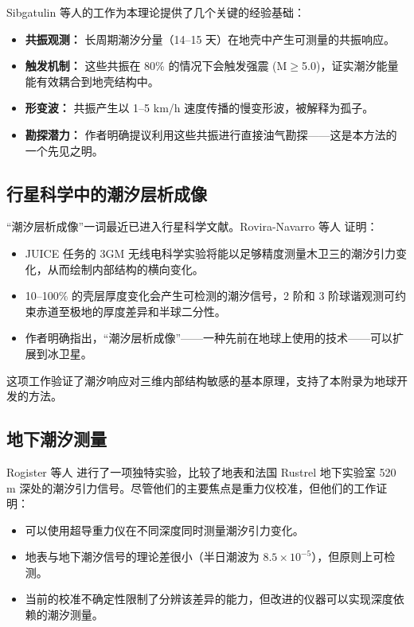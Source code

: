 \documentclass[12pt,a4paper]{article}
\theoremstyle{remark}
\begin{document}
	Sibgatulin 等人的工作为本理论提供了几个关键的经验基础：
	
	\begin{itemize}
		\item \textbf{共振观测：} 长周期潮汐分量（14–15 天）在地壳中产生可测量的共振响应。
		\item \textbf{触发机制：} 这些共振在 80\% 的情况下会触发强震 (M$\ge$5.0)，证实潮汐能量能有效耦合到地壳结构中。
		\item \textbf{形变波：} 共振产生以 1–5 km/h 速度传播的慢变形波，被解释为孤子。
		\item \textbf{勘探潜力：} 作者明确提议利用这些共振进行直接油气勘探——这是本方法的一个先见之明。
	\end{itemize}
	
	\subsection{行星科学中的潮汐层析成像}
	
	“潮汐层析成像”一词最近已进入行星科学文献。Rovira-Navarro 等人 \cite{RoviraNavarro2025} 证明：
	
	\begin{itemize}
		\item JUICE 任务的 3GM 无线电科学实验将能以足够精度测量木卫三的潮汐引力变化，从而绘制内部结构的横向变化。
		\item 10–100\% 的壳层厚度变化会产生可检测的潮汐信号，2 阶和 3 阶球谐观测可约束赤道至极地的厚度差异和半球二分性。
		\item 作者明确指出，“潮汐层析成像”——一种先前在地球上使用的技术——可以扩展到冰卫星。
	\end{itemize}
	
	这项工作验证了潮汐响应对三维内部结构敏感的基本原理，支持了本附录为地球开发的方法。
	
	\subsection{地下潮汐测量}
	
	Rogister 等人 \cite{Rogister2024} 进行了一项独特实验，比较了地表和法国 Rustrel 地下实验室 520 m 深处的潮汐引力信号。尽管他们的主要焦点是重力仪校准，但他们的工作证明：
	
	\begin{itemize}
		\item 可以使用超导重力仪在不同深度同时测量潮汐引力变化。
		\item 地表与地下潮汐信号的理论差很小（半日潮波为 $8.5 \times 10^{-5}$），但原则上可检测。
		\item 当前的校准不确定性限制了分辨该差异的能力，但改进的仪器可以实现深度依赖的潮汐测量。
	\end{itemize}
	
\end{document}
